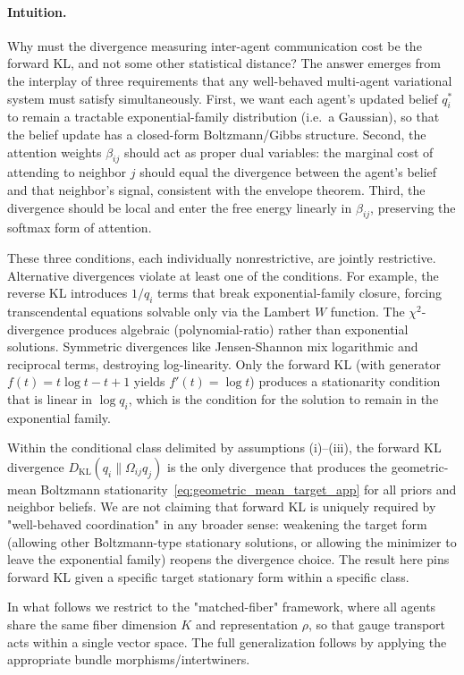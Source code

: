 \documentclass[11pt]{article}
\begin{document}
\paragraph{Intuition.}
Why must the divergence measuring inter-agent communication cost be the forward KL, and not some other statistical distance? The answer emerges from the interplay of three requirements that any well-behaved multi-agent variational system must satisfy simultaneously. First, we want each agent's updated belief $q_i^*$ to remain a tractable exponential-family distribution (i.e.\ a Gaussian), so that the belief update has a closed-form Boltzmann/Gibbs structure. Second, the attention weights $\beta_{ij}$ should act as proper dual variables: the marginal cost of attending to neighbor $j$ should equal the divergence between the agent's belief and that neighbor's signal, consistent with the envelope theorem. Third, the divergence should be local and enter the free energy linearly in $\beta_{ij}$, preserving the softmax form of attention.

These three conditions, each individually nonrestrictive, are jointly restrictive. Alternative divergences violate at least one of the conditions. For example, the reverse KL introduces $1/q_i$ terms that break exponential-family closure, forcing transcendental equations solvable only via the Lambert $W$ function. The $\chi^2$-divergence produces algebraic (polynomial-ratio) rather than exponential solutions. Symmetric divergences like Jensen-Shannon mix logarithmic and reciprocal terms, destroying log-linearity. Only the forward KL (with generator $f(t) = t\log t - t + 1$ yields $f'(t) = \log t$) produces a stationarity condition that is linear in $\log q_i$, which is the condition for the solution to remain in the exponential family.

Within the conditional class delimited by assumptions (i)--(iii), the forward KL divergence $D_{\mathrm{KL}}(q_i \| \Omega_{ij} q_j)$ is the only divergence that produces the geometric-mean Boltzmann stationarity~\eqref{eq:geometric_mean_target_app} for all priors and neighbor beliefs. We are not claiming that forward KL is uniquely required by "well-behaved coordination" in any broader sense: weakening the target form (allowing other Boltzmann-type stationary solutions, or allowing the minimizer to leave the exponential family) reopens the divergence choice. The result here pins forward KL given a specific target stationary form within a specific class.

In what follows we restrict to the "matched-fiber" framework, where all agents share the same fiber dimension $K$ and representation $\rho$, so that gauge transport acts within a single vector space. The full generalization follows by applying the appropriate bundle morphisms/intertwiners.
\end{document}
